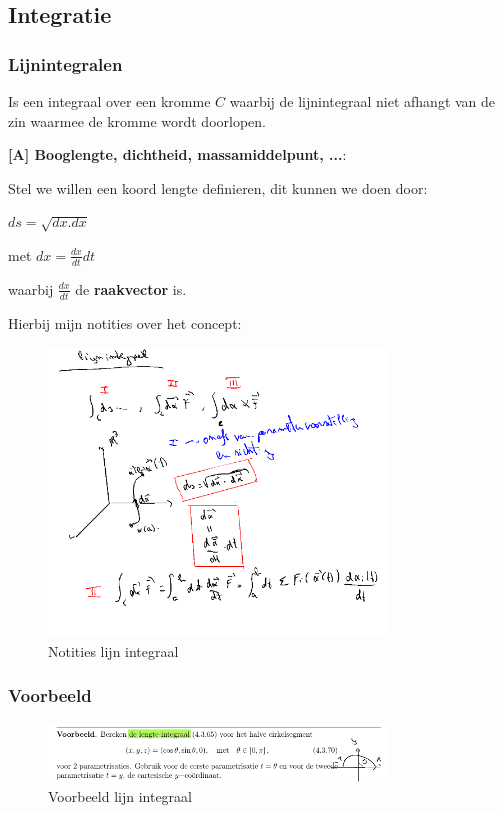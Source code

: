 \documentclass[a4paper]{article}
\begin{document}
\subsection{Integratie}

\subsubsection{Lijnintegralen}

Is een integraal over een kromme $C$ waarbij de lijnintegraal niet afhangt van de zin waarmee de kromme wordt doorlopen.

\textbf{[A] Booglengte, dichtheid, massamiddelpunt, ...}:

Stel we willen een koord lengte definieren, dit kunnen we doen door:

$ds = \sqrt{dx . dx}$

met $dx = \frac{dx}{dt} dt$

waarbij $\frac{dx}{dt}$ de \textbf{raakvector} is.

Hierbij mijn notities over het concept:


\begin{figure}[H]
	\centering
	\includegraphics[width=0.8\textwidth]{assets/notities_lijn_integraal.png}
	\caption{Notities lijn integraal}
	\label{fig:notities_lijn_integraal}
\end{figure}

\subsubsection{Voorbeeld}

\begin{figure}[H]
	\centering
	\includegraphics[width=0.8\textwidth]{assets/voorbeeld_lijn_integraal.png}
	\caption{Voorbeeld lijn integraal}
	\label{fig:voorbeeld_lijn_integraal}
\end{figure}
\end{document}
